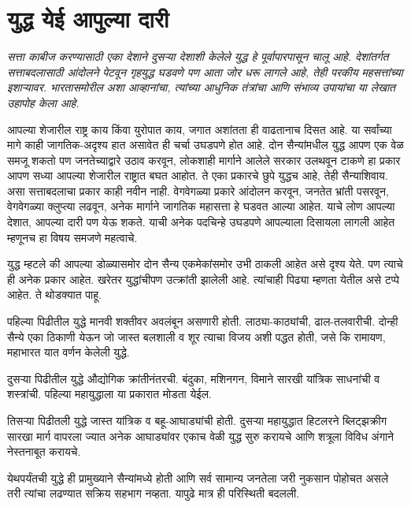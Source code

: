 \chapter{युद्ध येई आपुल्या दारी}

{\textit{सत्ता काबीज करण्यासाठी एका देशाने दुसऱ्या देशाशी केलेले युद्ध हे पूर्वापारपासून चालू आहे. देशांतर्गत सत्ताबदलासाठी आंदोलने पेटवून गृहयुद्ध घडवणे पण आता जोर धरू लागले आहे, तेही परकीय महसत्तांच्या इशाऱ्यावर. भारतासमोरील अशा आव्हानांचा, त्यांच्या आधुनिक तंत्रांचा आणि संभाव्य उपायांचा या लेखात उहापोह केला आहे.}}

\vspace{1.5em}

आपल्या शेजारील राष्ट्र काय किंवा युरोपात काय, जगात अशांतता ही वाढतानाच दिसत आहे. या सर्वांच्या मागे काही जागतिक-अदृश्य हात असावेत ही चर्चा उघडपणे होत आहे. दोन सैन्यांमधील युद्ध आपण एक वेळ समजू शकतो पण जनतेच्याद्वारे उठाव करवून, लोकशाही मार्गाने आलेले सरकार उलथवून टाकणे हा प्रकार आपण सध्या आपल्या शेजारील राष्ट्रात बघत आहोत. ते एका प्रकारचे छुपे युद्धच आहे, तेही सैन्याशिवाय. असा सत्ताबदलाचा प्रकार काही नवीन नाही. वेगवेगळ्या प्रकारे आंदोलन करवून, जनतेत भ्रांती पसरवून, वेगवेगळ्या क्लुप्त्या लढवून, अनेक मार्गाने जागतिक महासत्ता हे घडवत आल्या आहेत. याचे लोण आपल्या देशात, आपल्या दारी पण येऊ शकते. याची अनेक पदचिन्हे उघडपणे आपल्याला दिसायला लागली आहेत म्हणूनच हा विषय समजणे महत्वाचे.

युद्ध म्हटले की आपल्या डोळ्यासमोर दोन सैन्य एकमेकांसमोर उभी ठाकली आहेत असे दृश्य येते. पण त्याचे ही अनेक प्रकार आहेत. खरेतर युद्धांचीपण उत्क्रांती झालेली आहे. त्यांचाही पिढ्या म्हणता येतील असे टप्पे आहेत. ते थोडक्यात पाहू.

पहिल्या पिढीतील युद्धे मानवी शक्तीवर अवलंबून असणारी होती. लाठ्या-काठ्यांची, ढाल-तलवारीची. दोन्ही सैन्ये एका ठिकाणी येऊन जो जास्त बलशाली व शूर त्याचा विजय अशी पद्धत होती, जसे कि रामायण, महाभारत यात वर्णन केलेली युद्धे.

दुसऱ्या पिढीतील युद्धे औद्योगिक क्रांतीनंतरची. बंदुका, मशिनगन, विमाने सारखी यांत्रिक साधनांची व शस्त्रांची. पहिल्या महायुद्धाला या प्रकारात मोडता येईल.

तिसऱ्या पिढीतली युद्धे जास्त यांत्रिक व बहू-आघाड्यांची होती. दुसऱ्या महायुद्धात हिटलरने ब्लिट्झक्रीग सारखा मार्ग वापरला ज्यात अनेक आघाड्यांवर एकाच वेळी युद्ध सुरु करायचे आणि शत्रूला विविध अंगाने नेस्तनाबूत करायचे.

येथपर्यंतची युद्धे ही प्रामुख्याने सैन्यांमध्ये होती आणि सर्व सामान्य जनतेला जरी नुकसान पोहोचत असले तरी त्यांचा लढण्यात सक्रिय सहभाग नव्हता. यापुढे मात्र ही परिस्थिती बदलली.

